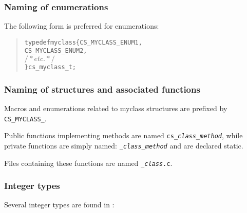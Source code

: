 \subsubsection{Naming of enumerations}

The following form is preferred for enumerations:

\begin{quote}
\begin{alltt}
typedef myclass \{ CS_MYCLASS_ENUM1,
                   CS_MYCLASS_ENUM2,
                \( /* etc. */ \)
                \} cs_myclass_t;
\end{alltt}
\end{quote}

\subsubsection{Naming of structures and associated functions}

Macros and enumerations related to myclass structures
are prefixed by \verb=CS_MYCLASS_=.

Public functions implementing methods are named
 \texttt{cs\_\textit{class\_method}}, while private functions are simply named:
\texttt{\_\textit{class\_method}} and are declared static.

Files containing these functions are named \texttt{\_\textit{class}.c}.

\subsubsection{Integer types}

Several integer types are found in \CS:

